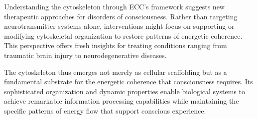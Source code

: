 Understanding the cytoskeleton through ECC's framework suggests new therapeutic approaches for disorders of consciousness. Rather than targeting neurotransmitter systems alone, interventions might focus on supporting or modifying cytoskeletal organization to restore patterns of energetic coherence. This perspective offers fresh insights for treating conditions ranging from traumatic brain injury to neurodegenerative diseases.

The cytoskeleton thus emerges not merely as cellular scaffolding but as a fundamental substrate for the energetic coherence that consciousness requires. Its sophisticated organization and dynamic properties enable biological systems to achieve remarkable information processing capabilities while maintaining the specific patterns of energy flow that support conscious experience.